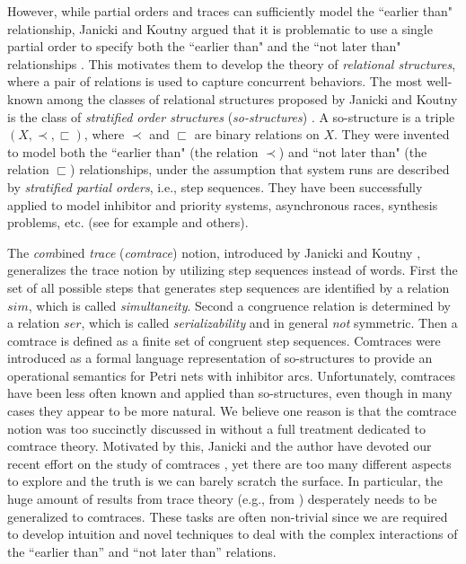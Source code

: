 \documentclass{llncs}
\begin{document}
However, while partial orders and traces can sufficiently model the ``earlier than" relationship, Janicki and Koutny argued that it is problematic to use a single partial order to specify both  the ``earlier than" and  the ``not later than" relationships \cite{J4}. This motivates them to develop the theory of \emph{relational structures}, where a pair of relations is used to capture concurrent behaviors.  The most well-known among the classes of relational structures  proposed by Janicki and Koutny is the class of \emph{stratified order structures} (\emph{so-structures}) \cite{GP,JK0,JK95,JK97,J0}. A so-structure is a triple $(X,\prec,\sqsubset)$, where $\prec$ and $\sqsubset$ are binary relations on $X$. They were invented to model both the ``earlier than" (the relation $\prec$) and ``not later than" (the relation $\sqsubset$) relationships, under the assumption that system runs are described by \emph{stratified partial orders}, i.e., step sequences. They have been successfully applied to model inhibitor and priority systems, asynchronous races, synthesis problems, etc. (see for example \cite{JK95,JK99,JLM06,JLM08,KK,KK08} and others). 

The \emph{com}bined \emph{trace} (\emph{comtrace}) notion, introduced by Janicki and Koutny \cite{JK95}, generalizes the trace notion by utilizing step sequences instead of words. First the set of all possible steps that generates step sequences are identified by a relation $sim$, which is called {\em simultaneity}. Second a congruence relation is determined by a relation $ser$, which is called {\em serializability} and in general \emph{not} symmetric. Then a comtrace is defined as a finite set of congruent step sequences. Comtraces were introduced as a formal language representation of so-structures to provide an operational semantics for  Petri nets with inhibitor arcs. Unfortunately, comtraces have been less often known and applied than so-structures, even though in many cases they appear to be more natural. We believe one  reason is that the comtrace notion was too succinctly discussed in \cite{JK95} without a full treatment dedicated to comtrace theory. Motivated by this, Janicki and the author have devoted our recent effort on the study of comtraces \cite{JL08,Le,JL09}, yet there are too many different aspects to explore and the truth is we can barely scratch the surface. In particular, the huge amount of results from  trace theory (e.g., from \cite{DR,DM}) desperately needs to be generalized to comtraces. These  tasks are often non-trivial since we are required to develop intuition and novel techniques to deal with the complex interactions of the ``earlier than'' and ``not later than'' relations.
\end{document}

